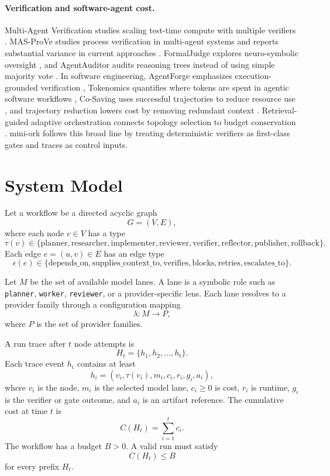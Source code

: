 \documentclass[11pt]{article}
\begin{document}
\paragraph{Verification and software-agent cost.}
Multi-Agent Verification studies scaling test-time compute with multiple
verifiers \cite{mav2025}. MAS-ProVe studies process verification in
multi-agent systems and reports substantial variance in current approaches
\cite{masprove2026}. FormalJudge explores neuro-symbolic oversight
\cite{formaljudge2026}, and AgentAuditor audits reasoning trees instead of
using simple majority vote \cite{agentauditor2026}. In software engineering,
AgentForge emphasizes execution-grounded verification \cite{agentforge2026},
Tokenomics quantifies where tokens are spent in agentic software workflows
\cite{tokenomics2026}, Co-Saving uses successful trajectories to reduce
resource use \cite{cosaving2025}, and trajectory reduction lowers cost by
removing redundant context \cite{agentdiet2025}. Retrieval-guided adaptive
orchestration connects topology selection to budget conservation
\cite{rgao2026}. mini-ork follows this broad line by treating deterministic
verifiers as first-class gates and traces as control inputs.

\section{System Model}

Let a workflow be a directed acyclic graph
\[
G=(V,E),
\]
where each node $v\in V$ has a type
\[
\tau(v) \in \{\text{planner}, \text{researcher}, \text{implementer},
\text{reviewer}, \text{verifier}, \text{reflector}, \text{publisher},
\text{rollback}\}.
\]
Each edge $e=(u,v)\in E$ has an edge type
\[
\epsilon(e)\in\{\text{depends\_on},\text{supplies\_context\_to},
\text{verifies},\text{blocks},\text{retries},\text{escalates\_to}\}.
\]

Let $M$ be the set of available model lanes. A lane is a symbolic role such as
\texttt{planner}, \texttt{worker}, \texttt{reviewer}, or a provider-specific
lens. Each lane resolves to a provider family through a configuration mapping
\[
\lambda:M\rightarrow P,
\]
where $P$ is the set of provider families.

A run trace after $t$ node attempts is
\[
H_t=\{h_1,h_2,\ldots,h_t\}.
\]
Each trace event $h_i$ contains at least
\[
h_i=(v_i,\tau(v_i),m_i,c_i,r_i,g_i,a_i),
\]
where $v_i$ is the node, $m_i$ is the selected model lane, $c_i\ge 0$ is cost,
$r_i$ is runtime, $g_i$ is the verifier or gate outcome, and $a_i$ is an
artifact reference. The cumulative cost at time $t$ is
\[
C(H_t)=\sum_{i=1}^{t}c_i.
\]
The workflow has a budget $B>0$. A valid run must satisfy
\[
C(H_t)\le B
\]
for every prefix $H_t$.
\end{document}
